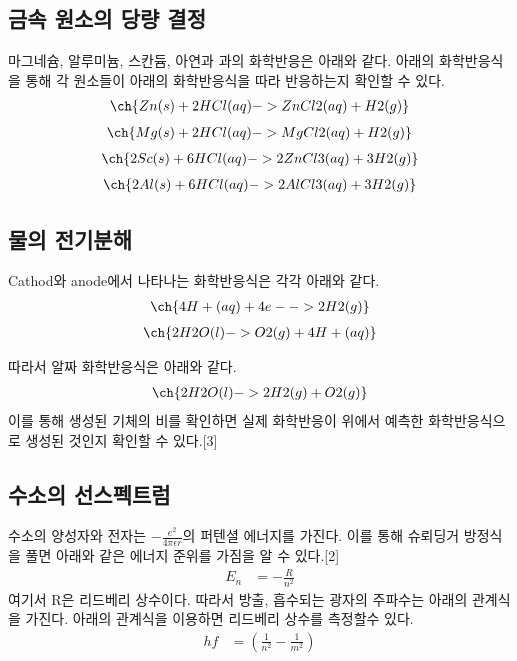 \documentclass[%
 reprint,
 amsmath,amssymb,
 aps,
]{revtex4-2}
\begin{document}
\subsection{\label{sec:level2}금속 원소의 당량 결정}
마그네슘, 알루미늄, 스칸듐, 아연과 과의 화학반응은 아래와 같다. 아래의 화학반응식을 통해 각 원소들이 아래의 화학반응식을 따라 반응하는지 확인할 수 있다.
\begin{align}
	\ch{Zn(s) + 2HCl(aq) ->ZnCl2(aq) + H2(g)}
\end{align}
\begin{align}
	\ch{Mg(s) + 2HCl(aq) ->MgCl2(aq) + H2(g)}
\end{align}
\begin{align}
	\ch{2Sc(s) + 6HCl(aq) ->2ZnCl3(aq) + 3H2(g)}
\end{align}
\begin{align}
	\ch{2Al(s) + 6HCl(aq) ->2AlCl3(aq) + 3H2(g)}
\end{align}

\subsection{\label{sec:level2}물의 전기분해}
Cathod와 anode에서 나타나는 화학반응식은 각각 아래와 같다.
\begin{align}
	\ch{4 H+ (aq) + 4 e- -> 2 H2 (g)}
\end{align}
\begin{align}
	\ch{2 H2O (l) -> O2 (g) + 4 H+ (aq)}
\end{align}

따라서 알짜 화학반응식은 아래와 같다.
\begin{align}
	\ch{2 H2O (l) -> 2 H2 (g) + O2 (g)}
\end{align}
이를 통해 생성된 기체의 비를 확인하면 실제 화학반응이 위에서 예측한 화학반응식으로 생성된 것인지 확인할 수 있다.[3]

\subsection{\label{sec:level2}수소의 선스펙트럼}
수소의 양성자와 전자는 $-\frac{e^{2}}{4\pi \epsilon r}$의 퍼텐셜 에너지를 가진다. 이를 통해 슈뢰딩거 방정식을 풀면 아래와 같은 에너지 준위를 가짐을 알 수 있다.[2]
\begin{align}
	E_{n} &= -\frac{R}{n^{2}}
\end{align}
여기서 R은 리드베리 상수이다. 따라서 방출, 흡수되는 광자의 주파수는 아래의 관계식을 가진다. 아래의 관계식을 이용하면 리드베리 상수를 측정할수 있다.
\begin{align}
	hf &= \left( \frac{1}{n^{2}} - \frac{1}{m^{2}} \right)
\end{align}
\end{document}
